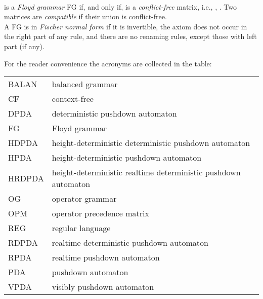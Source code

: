 \documentclass[3p,11pt]{elsarticle}
\begin{document}
\\
 is a \emph{Floyd grammar} FG if, and only if,  is a \emph{conflict-free} matrix, i.e., , . Two matrices are \emph{compatible} if their union is conflict-free.
\\
A FG is in \emph{Fischer normal form \cite{Fischer69}} if it is invertible, the axiom  does not occur in the right part of any rule, and there are no renaming rules, except those with left part  (if any).
\par
For the reader convenience the acronyms are collected in the table:
\begin{center}
\begin{tabular}{l|l}
  \hline
  BALAN & balanced grammar \\
  CF & context-free \\
  DPDA & deterministic pushdown automaton \\
  FG    & Floyd grammar \\
  HDPDA & height-deterministic deterministic pushdown automaton \\
  HPDA & height-deterministic  pushdown automaton \\
  HRDPDA & height-deterministic realtime deterministic pushdown automaton \\
  OG & operator grammar \\
  OPM & operator precedence matrix \\
  REG & regular language \\
  RDPDA & realtime deterministic pushdown automaton \\
    RPDA & realtime pushdown automaton \\
  PDA & pushdown automaton \\
  VPDA & visibly pushdown automaton\\
  \hline
\end{tabular}
\end{center}
\end{document}
